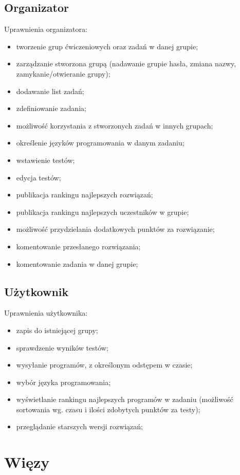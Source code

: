 \documentclass[a4paper]{mwart}
\begin{document}
\subsection{Organizator}
Uprawnienia organizatora:
\begin{itemize}
	\item tworzenie grup ćwiczeniowych oraz zadań w danej grupie;
	\item zarządzanie stworzona grupą (nadawanie grupie hasła, zmiana nazwy, zamykanie/otwieranie grupy);
	\item dodawanie list zadań;
	\item zdefiniowanie zadania;
	\item możliwość korzystania z stworzonych zadań w innych grupach;
	\item określenie języków programowania w danym zadaniu;
	\item wstawienie testów;
	\item edycja testów;
	\item publikacja rankingu najlepszych rozwiązań;
	\item publikacja rankingu najlepszych uczestników w grupie;
	\item możliwość przydzielania dodatkowych punktów za rozwiązanie;
	\item komentowanie przesłanego rozwiązania;
	\item komentowanie zadania w danej grupie; \\
\end{itemize}

\subsection{Użytkownik}
Uprawnienia użytkownika:
\begin{itemize}
	\item zapis do istniejącej grupy;
	\item sprawdzenie wyników testów;
	\item wysyłanie programów, z określonym odstępem w czasie;
	\item wybór języka programowania;
	\item wyświetlanie rankingu najlepszych programów w zadaniu (możliwość sortowania wg. czasu i ilości zdobytych punktów za testy);
	\item przeglądanie starszych wersji rozwiązań;\\
\end{itemize}
\section{Więzy}
\end{document}
